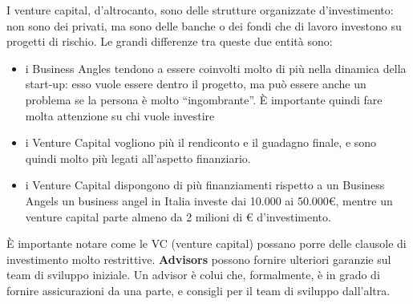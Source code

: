 I venture capital, d'altrocanto, sono delle strutture organizzate
d'investimento: non sono dei privati, ma sono delle banche o dei fondi che di
lavoro investono su progetti di rischio. Le grandi differenze tra queste due
entità sono:
\begin{itemize}
 \item i Business Angles tendono a essere coinvolti molto di più nella dinamica
della start-up: esso vuole essere dentro il progetto, ma può essere anche un
problema se la persona è molto ``ingombrante''. È importante quindi fare molta
attenzione su chi vuole investire
 \item i Venture Capital vogliono più il rendiconto e il guadagno finale, e
sono quindi molto più legati all'aspetto finanziario.
 \item i Venture Capital dispongono di più finanziamenti rispetto a un
Business Angels un business angel in Italia investe dai 10.000 ai
50.000\euro{}, mentre un venture capital parte almeno da 2 milioni di \euro{}
d'investimento.
\end{itemize}

È importante notare come le VC (venture capital) possano porre delle clausole
di investimento molto restrittive. \textbf{Advisors} possono fornire ulteriori
garanzie sul team di sviluppo iniziale. Un advisor è colui che, formalmente, è
in grado di fornire assicurazioni da una parte, e consigli per il team di
sviluppo dall'altra.
